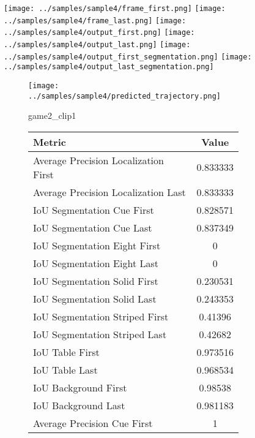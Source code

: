\begin{figure}
    \texttt{[image: ../samples/sample4/frame\_first.png]}
    \texttt{[image: ../samples/sample4/frame\_last.png]}
    \newline
    \texttt{[image: ../samples/sample4/output\_first.png]}
    \texttt{[image: ../samples/sample4/output\_last.png]}
    \newline
    \texttt{[image: ../samples/sample4/output\_first\_segmentation.png]}
    \texttt{[image: ../samples/sample4/output\_last\_segmentation.png]}
    \newline
    \begin{subfigure}[b]{0.49\textwidth}
        \vspace{20pt}
        \texttt{[image: ../samples/sample4/predicted\_trajectory.png]}
        \caption*{game2\_clip1}
    \end{subfigure}
\begin{subfigure}[b]{0.49\textwidth}
    \begin{tabular}{|l|c|}
        \hline
        \textbf{Metric} & \textbf{Value} \\
        \hline
        Average Precision Localization First & 0.833333 \\
        Average Precision Localization Last & 0.833333 \\
        \hline
        IoU Segmentation Cue First & 0.828571 \\
        IoU Segmentation Cue Last & 0.837349 \\
        IoU Segmentation Eight First & 0 \\
        IoU Segmentation Eight Last & 0 \\
        IoU Segmentation Solid First & 0.230531 \\
        IoU Segmentation Solid Last & 0.243353 \\
        IoU Segmentation Striped First & 0.41396 \\
        IoU Segmentation Striped Last & 0.42682 \\
        \hline
        IoU Table First & 0.973516 \\
        IoU Table Last & 0.968534 \\
        IoU Background First & 0.98538 \\
        IoU Background Last & 0.981183 \\
        \hline
        Average Precision Cue First & 1 \\

\end{tabular}
\end{subfigure}
\end{figure}
